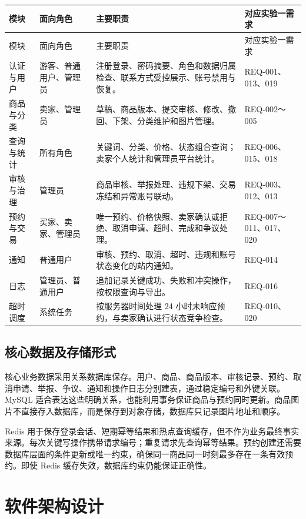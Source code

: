 \documentclass[12pt,a4paper]{ctexart}
\begin{document}
\begin{longtable}{L{0.15\textwidth}L{0.19\textwidth}L{0.42\textwidth}L{0.14\textwidth}}
\toprule
模块 & 面向角色 & 主要职责 & 对应实验一需求\\
\midrule
\endfirsthead
\toprule
模块 & 面向角色 & 主要职责 & 对应实验一需求\\
\midrule
\endhead
认证与用户 & 游客、普通用户、管理员 & 注册登录、密码摘要、角色和数据归属检查、联系方式受控展示、账号禁用与恢复。 & REQ-001、013、019\\
商品与分类 & 卖家、管理员 & 草稿、商品版本、提交审核、修改、撤回、下架、分类维护和图片管理。 & REQ-002～005\\
查询与统计 & 所有角色 & 关键词、分类、价格、状态组合查询；卖家个人统计和管理员平台统计。 & REQ-006、015、018\\
审核与治理 & 管理员 & 商品审核、举报处理、违规下架、交易冻结和异常账号联动。 & REQ-003、012、013\\
预约与交易 & 买家、卖家、管理员 & 唯一预约、价格快照、卖家确认或拒绝、取消申请、超时、完成和争议处理。 & REQ-007～011、017、020\\
通知 & 普通用户 & 审核、预约、取消、超时、违规和账号状态变化的站内通知。 & REQ-014\\
日志 & 管理员、普通用户 & 追加记录关键成功、失败和冲突操作，按权限查询与导出。 & REQ-016\\
超时调度 & 系统任务 & 按服务器时间处理 24 小时未响应预约，与卖家确认进行状态竞争检查。 & REQ-010、020\\
\bottomrule
\end{longtable}

\subsection{核心数据及存储形式}

核心业务数据采用关系数据库保存。用户、商品、商品版本、审核记录、预约、取消申请、举报、争议、通知和操作日志分别建表，通过稳定编号和外键关联。MySQL 适合表达这些明确关系，也能利用事务保证商品与预约同时更新。商品图片不直接存入数据库，而是保存到对象存储，数据库只记录图片地址和顺序。

Redis 用于保存登录会话、短期幂等结果和热点查询缓存，但不作为业务最终事实来源。每次关键写操作携带请求编号；重复请求先查询幂等结果。预约创建还需要数据库层面的条件更新或唯一约束，确保同一商品同一时刻最多存在一条有效预约。即使 Redis 缓存失效，数据库约束仍能保证正确性。

\section{软件架构设计}
\end{document}
